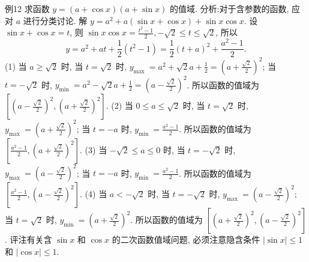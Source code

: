 例12 求函数 $y=(a+\cos x)(a+\sin x)$ 的值域.
分析:对于含参数的函数, 应对 $a$ 进行分类讨论.
解 $y=a^2+a(\sin x+\cos x)+\sin x \cos x$.
设 $\sin x+\cos x=t$, 则 $\sin x \cos x=\frac{t^2-1}{2},-\sqrt{2} \leqslant t \leqslant \sqrt{2}$, 所以
$$
y=a^2+a t+\frac{1}{2}\left(t^2-1\right)=\frac{1}{2}(t+a)^2+\frac{a^2-1}{2} .
$$
(1) 当 $a \geqslant \sqrt{2}$ 时, 当 $t=\sqrt{2}$ 时, $y_{\text {max }}=a^2+\sqrt{2} a+\frac{1}{2}=\left(a+\frac{\sqrt{2}}{2}\right)^2$;
当 $t=-\sqrt{2}$ 时, $y_{\text {min }}=a^2-\sqrt{2} a+\frac{1}{2}=\left(a-\frac{\sqrt{2}}{2}\right)^2$.
所以函数的值域为 $\left[\left(a-\frac{\sqrt{2}}{2}\right)^2,\left(a+\frac{\sqrt{2}}{2}\right)^2\right]$.
(2) 当 $0 \leqslant a \leqslant \sqrt{2}$ 时, 当 $t=\sqrt{2}$ 时, $y_{\text {max }}=\left(a+\frac{\sqrt{2}}{2}\right)^2$;
当 $t=-a$ 时, $y_{\text {min }}=\frac{a^2-1}{2}$.
所以函数的值域为 $\left[\frac{a^2-1}{2},\left(a+\frac{\sqrt{2}}{2}\right)^2\right]$.
(3) 当 $-\sqrt{2} \leqslant a \leqslant 0$ 时, 当 $t=-\sqrt{2}$ 时, $y_{\text {max }}=\left(a-\frac{\sqrt{2}}{2}\right)^2$;
当 $t=-a$ 时, $y_{\text {min }}=\frac{a^2-1}{2}$.
所以函数的值域为 $\left[\frac{a^2-1}{2},\left(a-\frac{\sqrt{2}}{2}\right)^2\right]$.
(4) 当 $a<-\sqrt{2}$ 时, 当 $t=-\sqrt{2}$ 时, $y_{\text {max }}=\left(a-\frac{\sqrt{2}}{2}\right)^2$;
当 $t=\sqrt{2}$ 时, $y_{\text {min }}=\left(a+\frac{\sqrt{2}}{2}\right)^2$.
所以函数的值域为 $\left[\left(a+\frac{\sqrt{2}}{2}\right)^2,\left(a-\frac{\sqrt{2}}{2}\right)^2\right]$.
评注有关含 $\sin x$ 和 $\cos x$ 的二次函数值域问题, 必须注意隐含条件 $|\sin x| \leqslant 1$ 和 $|\cos x| \leqslant 1$.



